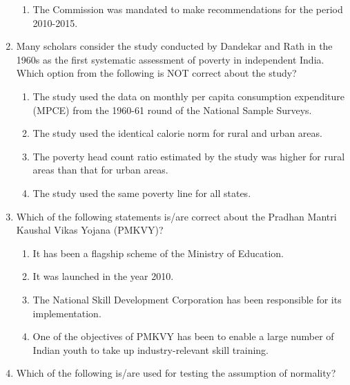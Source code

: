 \documentclass[12pt]{article}
\theoremstyle{remark}
\begin{document}
\begin{enumerate}
\begin{enumerate}
\item  The Commission was mandated to make recommendations for the period 2010-2015. 
\end{enumerate}
\hfill{}
\item  Many scholars consider the study conducted by Dandekar and Rath in the 1960s as the first systematic assessment of poverty in independent India. Which option from the following is NOT correct about the study? 
\begin{enumerate} 
\item  The study used the data on monthly per capita consumption expenditure (MPCE) from the 1960-61 round of the National Sample Surveys. 
\item  The study used the identical calorie norm for rural and urban areas. 
\item  The poverty head count ratio estimated by the study was higher for rural areas than that for urban areas. 
\item  The study used the same poverty line for all states. 
\end{enumerate}
\hfill{}
\item  Which of the following statements is/are correct about the Pradhan Mantri Kaushal Vikas Yojana (PMKVY)? 
\begin{enumerate} 
\item  It has been a flagship scheme of the Ministry of Education. 
\item  It was launched in the year 2010. 
\item  The National Skill Development Corporation has been responsible for its implementation. 
\item  One of the objectives of PMKVY has been to enable a large number of Indian youth to take up industry-relevant skill training. 
\end{enumerate}
\hfill{}
\item Which of the following is/are used for testing the assumption of normality? 
\begin{enumerate}  \end{enumerate}
\hfill{}

\end{enumerate}
\end{document}

